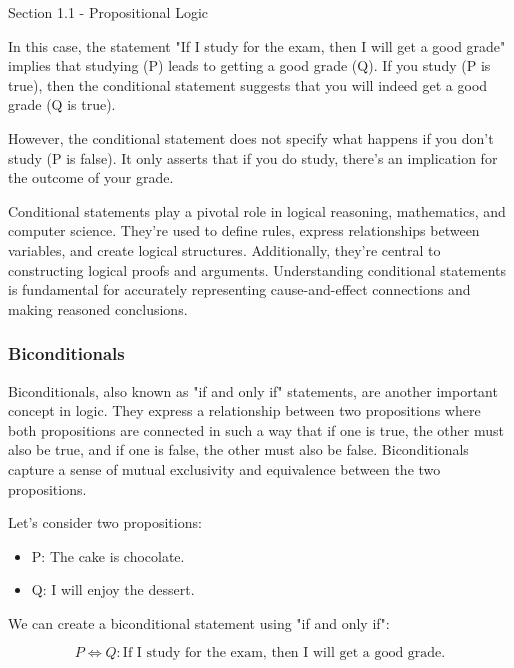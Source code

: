 \begin{notes}{Section 1.1 - Propositional Logic}
\begin{Highlight}
        In this case, the statement "If I study for the exam, then I will get a good grade" implies that studying (P) leads to getting a good grade (Q). If you study (P is true), then the conditional statement suggests 
        that you will indeed get a good grade (Q is true).

        However, the conditional statement does not specify what happens if you don't study (P is false). It only asserts that if you do study, there's an implication for the outcome of your grade.
    \end{Highlight}

    Conditional statements play a pivotal role in logical reasoning, mathematics, and computer science. They're used to define rules, express relationships between variables, and create logical structures. Additionally, 
    they're central to constructing logical proofs and arguments. Understanding conditional statements is fundamental for accurately representing cause-and-effect connections and making reasoned conclusions.

    \subsubsection*{Biconditionals}

    Biconditionals, also known as "if and only if" statements, are another important concept in logic. They express a relationship between two propositions where both propositions are connected in such a way that if one is 
    true, the other must also be true, and if one is false, the other must also be false. Biconditionals capture a sense of mutual exclusivity and equivalence between the two propositions.

    \begin{Highlight}
        Let's consider two propositions:

        \begin{itemize}
            \item P: The cake is chocolate.
            \item Q: I will enjoy the dessert.
        \end{itemize}

        We can create a biconditional statement using "if and only if":

        \begin{equation}
            P \Leftrightarrow Q: \text{If I study for the exam, then I will get a good grade.}
        \end{equation}


\end{Highlight}
\end{notes}
